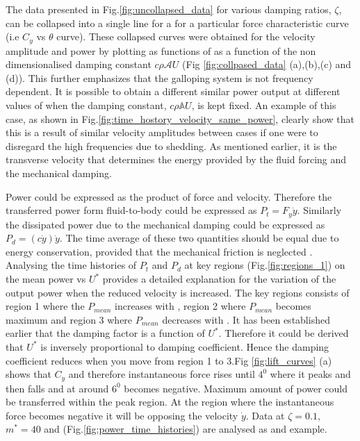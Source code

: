  The data presented in Fig.\ref{fig:uncollapsed_data} for various damping ratios, $\zeta$, can be collapsed into a single line for a for a particular force characteristic curve (i.e $C_y$ vs $\theta$ curve). These collapsed curves were  obtained for the velocity amplitude  and power by plotting as functions of as a function of  the non dimensionalised  damping constant $c\rho\mathcal{A}U$ 
(Fig \ref{fig:collpased_data} (a),(b),(c) and (d)).  This further emphasizes that the galloping system is not frequency dependent. It is possible to obtain a different similar power output at different values of \ustar when the damping constant, $c\rho\mathbb{A}U$, is kept fixed. An example of this case, as shown in Fig.\ref{fig:time_hostory_velocity_same_power}, clearly show that this is a result of similar velocity amplitudes between cases if one were to disregard the high frequencies due to shedding. As mentioned earlier, it is the transverse velocity that determines the energy provided by the fluid forcing and the mechanical damping.


 



 
 Power could be expressed as the product of force and velocity. Therefore the transferred power form fluid-to-body could be expressed as $P_t=F_y\dot{y}$. Similarly the dissipated power due to the mechanical damping could be expressed as $P_d=(c\dot{y})\dot{y}$. The time average of these two quantities should be equal due to energy conservation, provided that the mechanical friction is neglected . Analysing the  time histories of $P_t $ and $P_d$ at key regions (Fig.\ref{fig:regions_1}) on the mean power vs $U^*$ provides a detailed explanation for the variation of the output power when the reduced velocity is increased. The key regions consists of region 1 where the $P_{mean}$ increases with \ustar, region 2 where $P_{mean}$ becomes maximum and region 3 where $P_{mean}$ decreases with \ustar. It has been established earlier that the damping factor is a function of $U^*$. Therefore it could be derived that $U^*$ is inversely proportional to damping coefficient. Hence the damping coefficient reduces when you move from region 1 to 3.Fig \ref{fig:lift_curves} (a) shows that $C_y$ and therefore instantaneous force rises until $4^0$ where it peaks and then falls and at around $6^0$ becomes negative. Maximum amount of power could be transferred within the peak region. At the region where the instantaneous force becomes negative it will be opposing the velocity $\dot{y}$. Data at $\zeta=0.1$, $m^*=40$ and  (Fig.\ref{fig:power_time_histories}) are analysed as and example.  


